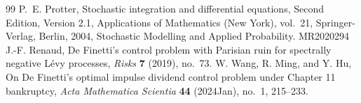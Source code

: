 \documentclass[10pt,a4paper]{amsart}
\begin{document}
\begin{thebibliography}{99}
 P.~E. Protter, Stochastic integration and differential equations, Second Edition, Version 2.1, Applications of Mathematics (New York), vol.~21, Springer-Verlag, Berlin, 2004, Stochastic Modelling and Applied Probability. MR2020294
 J.-F. Renaud, De {F}inetti's control problem with {P}arisian ruin for spectrally negative {L}\'evy processes, \emph{Risks} \textbf{7} (2019), no.~73.
 W. Wang, R. Ming, and Y. Hu, {On De Finetti's optimal impulse dividend control problem under Chapter 11 bankruptcy}, \emph{Acta Mathematica Scientia} \textbf{44} (2024Jan), no.~1, 215--233.
\end{thebibliography}
\end{document}
